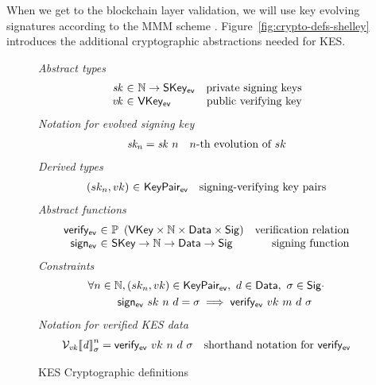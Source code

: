 When we get to the blockchain layer validation, we will use
key evolving signatures according to the MMM scheme \citep{cryptoeprint:2001:034}.
Figure~\ref{fig:crypto-defs-shelley} introduces the additional cryptographic abstractions
needed for KES.


\begin{figure}[htb]
  \emph{Abstract types}
  \begin{equation*}
    \begin{array}{r@{~\in~}lr}
      \var{sk} & \N \to \SKeyEv & \text{private signing keys}\\
      \var{vk} & \VKeyEv & \text{public verifying key}\\
    \end{array}
  \end{equation*}
  \emph{Notation for evolved signing key}
  \begin{align*}
    & \mathit{sk_n} = \mathit{sk}~n & n\text{-th evolution of }sk
  \end{align*}
  \emph{Derived types}
  \begin{equation*}
    \begin{array}{r@{~\in~}lr}
      (sk_n, vk) & \KeyPairEv & \text{signing-verifying key pairs}
    \end{array}
  \end{equation*}
  \emph{Abstract functions}
  \begin{equation*}
    \begin{array}{r@{~\in~}lr}
      \fun{verify_{ev}} & \powerset{\left(\VKey \times \N \times \Data \times \Sig\right)}
                        & \text{verification relation}\\
      \fun{sign_{ev}} & \SKey \to \N \to \Data \to \Sig
                      & \text{signing function}\\
    \end{array}
  \end{equation*}
  \emph{Constraints}
  \begin{align*}
    & \forall n\in\mathbb{N}, (sk_n, vk) \in \mathsf{KeyPair_{ev}}, ~ d \in \mathsf{Data},~ \sigma \in \mathsf{Sig} \cdot \\
    & ~~~~~~~~\mathsf{sign_{ev}} ~ sk ~ n ~ d = \sigma \implies \mathsf{verify_{ev}} ~ vk ~ m ~ d ~ \sigma
  \end{align*}
  \emph{Notation for verified KES data}
  \begin{align*}
    & \mathcal{V}_{\mathit{vk}}{\llbracket \mathit{d} \rrbracket}_{\sigma}^n = \mathsf{verify_{ev}} ~ vk ~ n ~ d ~ \sigma
    & \text{shorthand notation for } \mathsf{verify_{ev}}
  \end{align*}
  \caption{KES Cryptographic definitions}
  \label{fig:kes-defs-shelley}
\end{figure}
\clearpage

